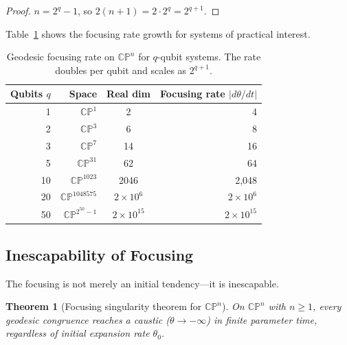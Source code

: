 \documentclass[12pt,a4paper]{article}
\newtheorem{theorem}{Theorem}
\begin{document}
\begin{proof}
$n = 2^q - 1$, so $2(n+1) = 2 \cdot 2^q = 2^{q+1}$.
\end{proof}

Table~\ref{tab:rates} shows the focusing rate growth for systems of practical interest.

\begin{table}[H]
\centering
\begin{tabular}{rrcr}
\toprule
Qubits $q$ & Space & Real dim & Focusing rate $|d\theta/dt|$ \\
\midrule
1 & $\mathbb{CP}^1$ & 2 & 4 \\
2 & $\mathbb{CP}^3$ & 6 & 8 \\
3 & $\mathbb{CP}^7$ & 14 & 16 \\
5 & $\mathbb{CP}^{31}$ & 62 & 64 \\
10 & $\mathbb{CP}^{1023}$ & 2046 & 2{,}048 \\
20 & $\mathbb{CP}^{1048575}$ & $2 \times 10^6$ & $2 \times 10^6$ \\
50 & $\mathbb{CP}^{2^{50}-1}$ & $2 \times 10^{15}$ & $2 \times 10^{15}$ \\
\bottomrule
\end{tabular}
\caption{Geodesic focusing rate on $\mathbb{CP}^n$ for $q$-qubit systems. The rate doubles per qubit and scales as $2^{q+1}$.}
\label{tab:rates}
\end{table}

\subsection{Inescapability of Focusing}

The focusing is not merely an initial tendency---it is inescapable.

\begin{theorem}[Focusing singularity theorem for $\mathbb{CP}^n$]
\label{thm:focusing}
On $\mathbb{CP}^n$ with $n \geq 1$, every geodesic congruence reaches a caustic ($\theta \to -\infty$) in finite parameter time, regardless of initial expansion rate $\theta_0$.
\end{theorem}
\end{document}

